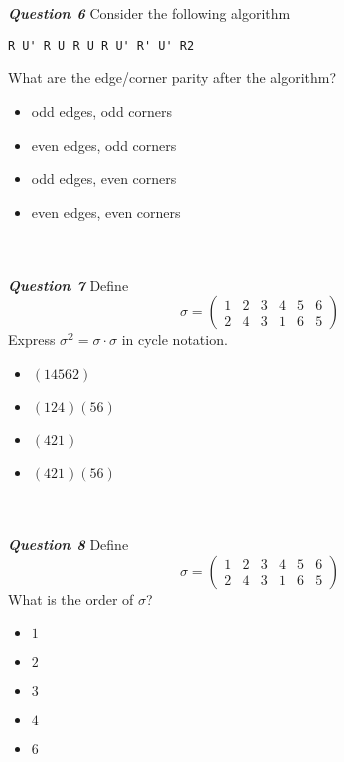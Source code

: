 \documentclass{article}
\begin{document}
\\\\
\textbf{\textit{Question 6}}
Consider the following algorithm
\begin{verbatim}
R U' R U R U R U' R' U' R2
\end{verbatim}
What are the edge/corner parity after the algorithm? 
\begin{itemize}
    \item odd edges, odd corners
    \item even edges, odd corners
    \item odd edges, even corners
    \item even edges, even corners
\end{itemize}
\\\\
\textbf{\textit{Question 7}}
Define 
\[ \sigma = \begin{pmatrix}
 1 & 2 & 3 & 4 & 5 & 6 \\
 2 & 4 & 3 & 1 & 6 & 5
\end{pmatrix}\]
Express $\sigma^2 = \sigma \cdot \sigma$ in cycle notation. 
\begin{itemize}
    \item $(14562)$
    \item $(124)(56)$
    \item $(421)$
    \item $(421)(56)$
\end{itemize}
\\\\
\textbf{\textit{Question 8}}
\question Define 
\[ \sigma = \begin{pmatrix}
 1 & 2 & 3 & 4 & 5 & 6 \\
 2 & 4 & 3 & 1 & 6 & 5
\end{pmatrix}\]
What is the order of $\sigma$? \\
\begin{itemize}
    \item $1$
    \item $2$
    \item $3$
    \item $4$
    \item $6$
\end{itemize}
\end{document}
